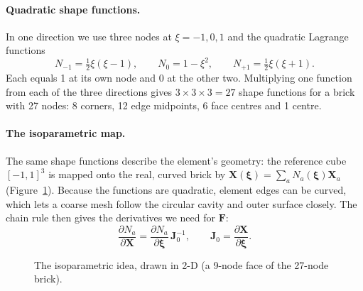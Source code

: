 \documentclass[11pt,a4paper]{article}
\numberwithin{equation}{section}
\newcommand{\F}{\mathbf{F}}
\newcommand{\X}{\mathbf{X}}
\begin{document}
\paragraph{Quadratic shape functions.}
In one direction we use three nodes at $\xi=-1,0,1$ and the quadratic Lagrange
functions
\begin{equation}
N_{-1}=\tfrac12\xi(\xi-1),\qquad N_0=1-\xi^2,\qquad N_{+1}=\tfrac12\xi(\xi+1).
\end{equation}
Each equals 1 at its own node and 0 at the other two. Multiplying one function from
each of the three directions gives $3\times3\times3=27$ shape functions for a brick
with 27 nodes: 8 corners, 12 edge midpoints, 6 face centres and 1 centre.

\paragraph{The isoparametric map.}
The same shape functions describe the element's geometry: the reference cube
$[-1,1]^3$ is mapped onto the real, curved brick by $\X(\bm\xi)=\sum_a N_a(\bm\xi)\X_a$
(Figure~\ref{fig:iso}). Because the functions are quadratic, element edges can be
curved, which lets a coarse mesh follow the circular cavity and outer surface
closely. The chain rule then gives the derivatives we need for $\F$:
\begin{equation}
\frac{\partial N_a}{\partial\X}=\frac{\partial N_a}{\partial\bm\xi}\,\mathbf{J}_0^{-1},
\qquad \mathbf{J}_0=\frac{\partial\X}{\partial\bm\xi}.
\end{equation}

\begin{figure}[H]
\centering
{}
\caption{The isoparametric idea, drawn in 2-D (a 9-node face of the 27-node brick).}
\label{fig:iso}
\end{figure}
\end{document}
